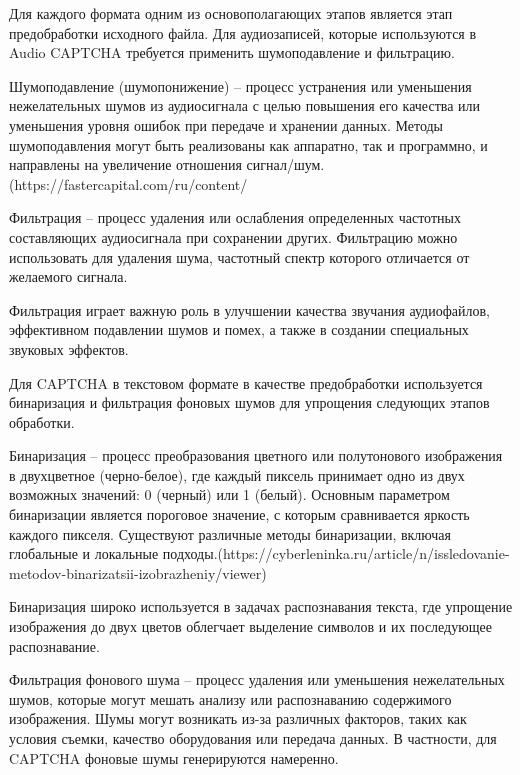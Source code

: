 Для каждого формата одним из основополагающих этапов является этап 
предобработки исходного файла. Для аудиозаписей, которые используются в Audio 
CAPTCHA требуется применить шумоподавление и фильтрацию.

Шумоподавление (шумопонижение) -- процесс устранения или уменьшения нежелательных 
шумов из аудиосигнала с целью повышения его качества или уменьшения уровня ошибок 
при передаче и хранении данных. Методы шумоподавления могут быть реализованы как 
аппаратно, так и программно, и направлены на увеличение отношения сигнал/шум.(https://fastercapital.com/ru/content/%

Фильтрация -- процесс удаления или ослабления определенных частотных составляющих 
аудиосигнала при сохранении других. Фильтрацию можно использовать для удаления 
шума, частотный спектр которого отличается от желаемого сигнала.

Фильтрация играет важную роль в улучшении качества звучания аудиофайлов, 
эффективном подавлении шумов и помех, а также в создании специальных звуковых 
эффектов.

Для CAPTCHA в текстовом формате в качестве предобработки используется бинаризация 
и фильтрация фоновых шумов для упрощения следующих этапов обработки.

Бинаризация -- процесс преобразования цветного или полутонового изображения в 
двухцветное (черно-белое), где каждый пиксель принимает одно из двух возможных 
значений: 0 (черный) или 1 (белый). Основным параметром бинаризации является 
пороговое значение, с которым сравнивается яркость каждого пикселя. Существуют 
различные методы бинаризации, включая глобальные и локальные подходы.(https://cyberleninka.ru/article/n/issledovanie-metodov-binarizatsii-izobrazheniy/viewer)

Бинаризация широко используется в задачах распознавания текста, где упрощение 
изображения до двух цветов облегчает выделение символов и их последующее 
распознавание.

Фильтрация фонового шума -- процесс удаления или уменьшения нежелательных шумов, 
которые могут мешать анализу или распознаванию содержимого изображения. Шумы 
могут возникать из-за различных факторов, таких как условия съемки, качество 
оборудования или передача данных. В частности, для CAPTCHA фоновые шумы 
генерируются намеренно.

